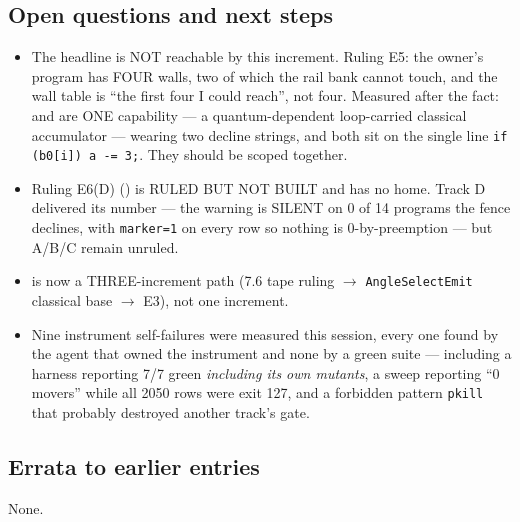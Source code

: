 \subsection*{Open questions and next steps}
\begin{itemize}
  \item The headline is NOT reachable by this increment. Ruling E5: the owner's program
        has FOUR walls, two of which the rail bank cannot touch, and the wall table is
        ``the first four I could reach'', not four. Measured after the fact:
         and  are ONE capability --- a quantum-dependent
        loop-carried classical accumulator --- wearing two decline strings, and both sit
        on the single line \texttt{if (b0[i]) a -= 3;}. They should be scoped together.
  \item Ruling E6(D) () is RULED BUT NOT BUILT and has no home. Track D delivered
        its number --- the warning is SILENT on 0 of 14 programs the fence declines, with
        \texttt{marker=1} on every row so nothing is 0-by-preemption --- but A/B/C remain
        unruled.
  \item {} is now a THREE-increment path (7.6 tape ruling $\rightarrow$
        \texttt{AngleSelectEmit} classical base $\rightarrow$ E3), not one increment.
  \item Nine instrument self-failures were measured this session, every one found by the
        agent that owned the instrument and none by a green suite --- including a harness
        reporting 7/7 green \emph{including its own mutants}, a sweep reporting ``0
        movers'' while all 2050 rows were exit 127, and a forbidden pattern
        \texttt{pkill} that probably destroyed another track's gate.
\end{itemize}

\subsection*{Errata to earlier entries}
None.
